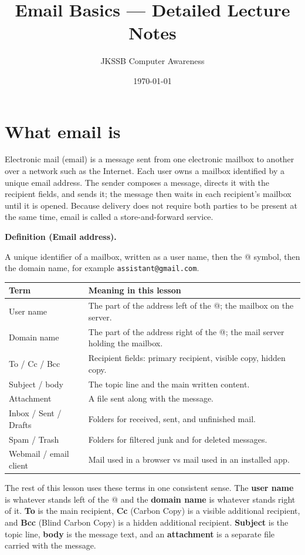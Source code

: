 \documentclass[11pt]{article}
\title{Email Basics --- Detailed Lecture Notes}
\author{JKSSB Computer Awareness}
\date{\today}
\newenvironment{definitionbox}[1]{%
  \par\noindent\textbf{Definition (#1).}\ \itshape
}{\par\vspace{0.3em}}
\begin{document}
\maketitle

\section{What email is}
Electronic mail (email) is a message sent from one electronic mailbox to
another over a network such as the Internet. Each user owns a mailbox
identified by a unique email address. The sender composes a message, directs
it with the recipient fields, and sends it; the message then waits in each
recipient's mailbox until it is opened. Because delivery does not require both
parties to be present at the same time, email is called a store-and-forward
service.

\begin{definitionbox}{Email address}
A unique identifier of a mailbox, written as a user name, then the @ symbol,
then the domain name, for example \texttt{assistant@gmail.com}.
\end{definitionbox}

\begin{center}
\begin{tabular}{p{}p{}}
\toprule
\textbf{Term} & \textbf{Meaning in this lesson} \\
\midrule
User name & The part of the address left of the @; the mailbox on the server. \\
Domain name & The part of the address right of the @; the mail server holding the mailbox. \\
To / Cc / Bcc & Recipient fields: primary recipient, visible copy, hidden copy. \\
Subject / body & The topic line and the main written content. \\
Attachment & A file sent along with the message. \\
Inbox / Sent / Drafts & Folders for received, sent, and unfinished mail. \\
Spam / Trash & Folders for filtered junk and for deleted messages. \\
Webmail / email client & Mail used in a browser vs mail used in an installed app. \\
\bottomrule
\end{tabular}
\end{center}

The rest of this lesson uses these terms in one consistent sense. The
\textbf{user name} is whatever stands left of the @ and the \textbf{domain
name} is whatever stands right of it. \textbf{To} is the main recipient,
\textbf{Cc} (Carbon Copy) is a visible additional recipient, and \textbf{Bcc}
(Blind Carbon Copy) is a hidden additional recipient. \textbf{Subject} is the
topic line, \textbf{body} is the message text, and an \textbf{attachment} is a
separate file carried with the message.
\end{document}
